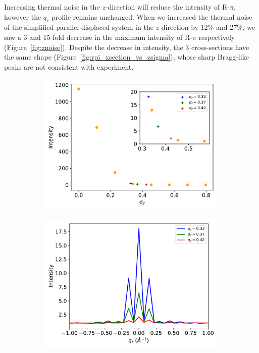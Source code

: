 \documentclass[journal=jpcbfk,manuscript=article]{achemso}
\begin{document}
  Increasing thermal noise in the $z$-direction will reduce the intensity
  of R-$\pi$, however the $q_r$ profile remains unchanged. When we increased the
  thermal noise of the simplified parallel displaced system in the $z$-direction by
  12\% and 27\%, we saw a 3 and 15-fold decrease in the maximum intensity of 
  R-$\pi$ respectively (Figure~\ref{fig:znoise}). Despite the decrease in 
  intensity, the 3 cross-sections have the same shape 
  (Figure~\ref{fig:rpi_xsection_vs_zsigma}), whose sharp Bragg-like peaks are
  not consistent with experiment. 
  
  \begin{figure}[!htb]
  \centering
  \begin{subfigure}{0.49\textwidth}
  \includegraphics[width=\textwidth]{intensity_vs_zsigma.pdf}
  \caption{}\label{fig:intensity_vs_zsigma}
  \end{subfigure}
  \begin{subfigure}{0.49\textwidth}
  \includegraphics[width=\textwidth]{rpi_xsection_vs_zsigma.pdf}

\end{subfigure}
\end{figure}
\end{document}
